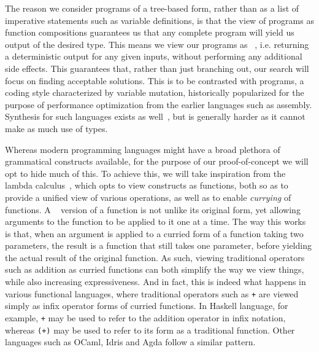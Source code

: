 \documentclass{article}
\begin{document}
The reason we consider programs of a tree-based form, rather than as a list of imperative statements such as variable definitions,
is that the view of programs as function compositions guarantees us that any complete program will yield us output of the desired type.
This means we view our programs as ~\citep{fortran95},
i.e. returning a deterministic output for any given inputs, without performing any additional side effects.
This guarantees that, rather than just branching out, our search will focus on finding acceptable solutions.
This is to be contrasted with  programs, a coding style characterized by variable mutation,
historically popularized for the purpose of performance optimization from the earlier languages such as assembly.
Synthesis for such languages exists as well~\citep{shi2019frangel}, but is generally harder as it cannot make as much use of types.

Whereas modern programming languages might have a broad plethora of grammatical constructs available,
for the purpose of our proof-of-concept we will opt to hide much of this.
To achieve this, we will take inspiration from the lambda calculus~\citep{lambdacalculus},
which opts to view constructs as functions,
both so as to provide a unified view of various operations, as well as to enable \emph{currying} of functions.
A ~\citep{currying} version of a function is not unlike its original form,
yet allowing arguments to the function to be applied to it one at a time.
The way this works is that, when an argument is applied to a curried form of a function taking two parameters,
the result is a function that still takes one parameter, before yielding the actual result of the original function.
As such, viewing traditional operators such as addition as curried functions can both simplify the way we view things,
while also increasing expressiveness.
And in fact, this is indeed what happens in various functional languages,
where traditional operators such as \verb|+| are viewed simply as infix operator forms of curried functions.
In Haskell language, for example, \verb|+| may be used to refer to the addition operator in infix notation,
whereas \verb|(+)| may be used to refer to its form as a traditional function.
Other languages such as OCaml, Idris and Agda follow a similar pattern.
\end{document}
